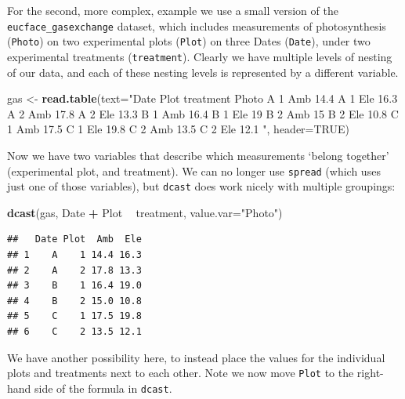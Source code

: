\documentclass[]{book}
\newenvironment{Shaded}{\begin{snugshade}}{\end{snugshade}}
\newcommand{\DataTypeTok}[1]{\textcolor[rgb]{0.13,0.29,0.53}{#1}}
\newcommand{\KeywordTok}[1]{\textcolor[rgb]{0.13,0.29,0.53}{\textbf{#1}}}
\newcommand{\NormalTok}[1]{#1}
\newcommand{\OperatorTok}[1]{\textcolor[rgb]{0.81,0.36,0.00}{\textbf{#1}}}
\newcommand{\OtherTok}[1]{\textcolor[rgb]{0.56,0.35,0.01}{#1}}
\newcommand{\StringTok}[1]{\textcolor[rgb]{0.31,0.60,0.02}{#1}}
\begin{document}
For the second, more complex, example we use a small version of the \texttt{eucface\_gasexchange} dataset, which includes measurements of photosynthesis (\texttt{Photo}) on two experimental plots (\texttt{Plot}) on three Dates (\texttt{Date}), under two experimental treatments (\texttt{treatment}). Clearly we have multiple levels of nesting of our data, and each of these nesting levels is represented by a different variable.

\begin{Shaded}
\begin{Highlighting}[]
\NormalTok{gas <-}\StringTok{ }\KeywordTok{read.table}\NormalTok{(}\DataTypeTok{text=}\StringTok{"Date    Plot    treatment   Photo}
\StringTok{A   1   Amb 14.4}
\StringTok{A   1   Ele 16.3}
\StringTok{A   2   Amb 17.8}
\StringTok{A   2   Ele 13.3}
\StringTok{B   1   Amb 16.4}
\StringTok{B   1   Ele 19}
\StringTok{B   2   Amb 15}
\StringTok{B   2   Ele 10.8}
\StringTok{C   1   Amb 17.5}
\StringTok{C   1   Ele 19.8}
\StringTok{C   2   Amb 13.5}
\StringTok{C   2   Ele 12.1}
\StringTok{"}\NormalTok{, }\DataTypeTok{header=}\OtherTok{TRUE}\NormalTok{)}
\end{Highlighting}
\end{Shaded}

Now we have two variables that describe which measurements `belong together' (experimental plot, and treatment). We can no longer use \texttt{spread} (which uses just one of those variables), but \texttt{dcast} does work nicely with multiple groupings:

\begin{Shaded}
\begin{Highlighting}[]
\KeywordTok{dcast}\NormalTok{(gas, Date }\OperatorTok{+}\StringTok{ }\NormalTok{Plot }\OperatorTok{~}\StringTok{ }\NormalTok{treatment, }\DataTypeTok{value.var=}\StringTok{"Photo"}\NormalTok{)}
\end{Highlighting}
\end{Shaded}

\begin{verbatim}
##   Date Plot  Amb  Ele
## 1    A    1 14.4 16.3
## 2    A    2 17.8 13.3
## 3    B    1 16.4 19.0
## 4    B    2 15.0 10.8
## 5    C    1 17.5 19.8
## 6    C    2 13.5 12.1
\end{verbatim}

We have another possibility here, to instead place the values for the individual plots and treatments next to each other. Note we now move \texttt{Plot} to the right-hand side of the formula in \texttt{dcast}.
\end{document}
